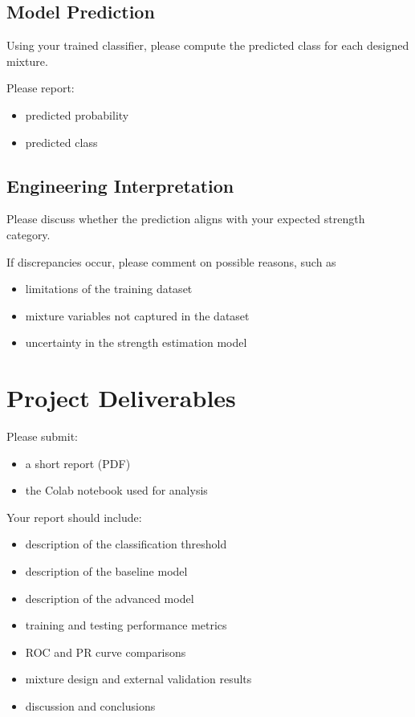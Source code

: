 \documentclass[12pt]{article}
\begin{document}
\subsection{Model Prediction}

Using your trained classifier, please compute the predicted class for each designed mixture.

Please report:

\begin{itemize}
\item predicted probability
\item predicted class
\end{itemize}

\subsection{Engineering Interpretation}

Please discuss whether the prediction aligns with your expected strength category.

If discrepancies occur, please comment on possible reasons, such as

\begin{itemize}
\item limitations of the training dataset
\item mixture variables not captured in the dataset
\item uncertainty in the strength estimation model
\end{itemize}

\section{Project Deliverables}

Please submit:

\begin{itemize}
\item a short report (PDF)
\item the Colab notebook used for analysis
\end{itemize}

Your report should include:

\begin{itemize}
\item description of the classification threshold
\item description of the baseline model
\item description of the advanced model
\item training and testing performance metrics
\item ROC and PR curve comparisons
\item mixture design and external validation results
\item discussion and conclusions
\end{itemize}
\end{document}
